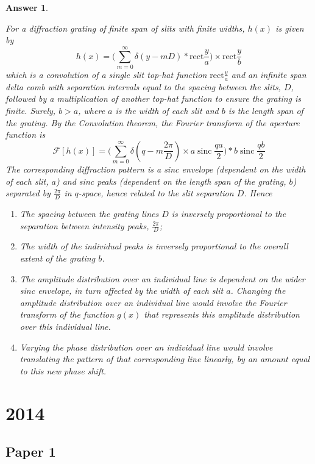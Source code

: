 \documentclass[a4paper]{article}
\DeclareMathOperator{\sinc}{sinc}
\newtheorem{ans}{Answer}[subsection]
\theoremstyle{new}
\begin{document}
\begin{ans}
\begin{figure}[H]
\end{figure}
For a diffraction grating of finite span of slits with finite widths, $h(x)$ is given by
$$h(x)=\bigg(\sum_{m=0}^\infty\delta(y-mD)*\text{rect}\frac{y}{a}\bigg)\times\text{rect}\frac{y}{b}$$
which is a convolution of a single slit top-hat function $\text{rect}\frac{y}{a}$ and an infinite span delta comb with separation intervals equal to the spacing between the slits, $D$, followed by a multiplication of another top-hat function to ensure the grating is finite. Surely, $b>a$, where $a$ is the width of each slit and $b$ is the length span of the grating. By the Convolution theorem, the Fourier transform of the aperture function is 
$$\mathcal{F}[h(x)]=\bigg(\sum_{m=0}^\infty\delta(q-m\frac{2\pi}{D})\times a\sinc\frac{qa}{2}\bigg)*b\sinc\frac{qb}{2}$$
The corresponding diffraction pattern is a sinc envelope (dependent on the width of each slit, $a$) and sinc peaks (dependent on the length span of the grating, $b$) separated by $\frac{2\pi}{D}$ in $q$-space, hence related to the slit separation $D$. Hence
\begin{enumerate}[label=(\alph*)]
    \item The spacing between the grating lines $D$ is inversely proportional to the separation between intensity peaks, $\frac{2\pi}{D}$;
    \item The width of the individual peaks is inversely proportional to the overall extent of the grating $b$.
    \item The amplitude distribution over an individual line is dependent on the wider sinc envelope, in turn affected by the width of each slit $a$. Changing the amplitude distribution over an individual line would involve the Fourier transform of the function $g(x)$ that represents this amplitude distribution over this individual line. 
    \item Varying the phase distribution over an individual line would involve translating the pattern of that corresponding line linearly, by an amount equal to this new phase shift.
\end{enumerate}
\end{ans}
\newpage
\section{2014}
\subsection{Paper 1}
\end{document}
